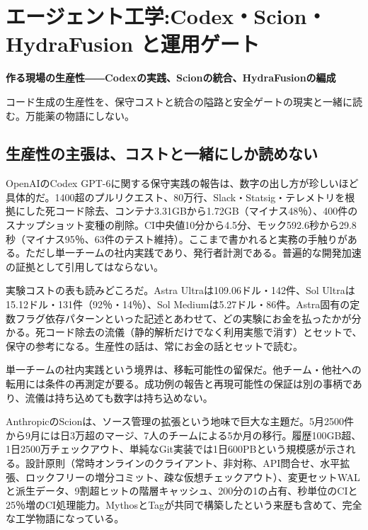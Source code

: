 \documentclass[lualatex,a4paper,10pt]{jlreq}
\begin{document}
\section{エージェント工学:Codex・Scion・HydraFusion と運用ゲート}
\label{sec:P4}

{\Large\bfseries 作る現場の生産性――Codexの実践、Scionの統合、HydraFusionの編成\par}
\smallskip
{\color{SurveyMuted}コード生成の生産性を、保守コストと統合の隘路と安全ゲートの現実と一緒に読む。万能薬の物語にしない。\par}
\bigskip

\subsection*{生産性の主張は、コストと一緒にしか読めない}

OpenAIのCodex GPT-6に関する保守実践の報告は、数字の出し方が珍しいほど具体的だ。1400超のプルリクエスト、80万行、Slack・Statsig・テレメトリを根拠にした死コード除去、コンテナ3.31GBから1.72GB（マイナス48％）、400件のスナップショット変種の削除。CI中央値10分から4.5分、モック592.6秒から29.8秒（マイナス95％、63件のテスト維持）。ここまで書かれると実務の手触りがある。ただし単一チームの社内実践であり、発行者計測である。普遍的な開発加速の証拠として引用してはならない。
\cite{B31}


実験コストの表も読みどころだ。Astra Ultraは109.06ドル・142件、Sol Ultraは15.12ドル・131件（92％・14％）、Sol Mediumは5.27ドル・86件。Astra固有の定数フラグ依存パターンといった記述とあわせて、どの実験にお金を払ったかが分かる。死コード除去の流儀（静的解析だけでなく利用実態で消す）とセットで、保守の参考になる。生産性の話は、常にお金の話とセットで読む。
\cite{B31}


単一チームの社内実践という境界は、移転可能性の留保だ。他チーム・他社への転用には条件の再測定が要る。成功例の報告と再現可能性の保証は別の事柄であり、流儀は持ち込めても数字は持ち込めない。
\cite{B31}


AnthropicのScionは、ソース管理の拡張という地味で巨大な主題だ。5月2500件から9月には日3万超のマージ、7人のチームによる5か月の移行。履歴100GB超、1日2500万チェックアウト、単純なGit実装では1日600PBという規模感が示される。設計原則（常時オンラインのクライアント、非対称、API問合せ、水平拡張、ロックフリーの増分コミット、疎な仮想チェックアウト）、変更セットWALと派生データ、9割超ヒットの階層キャッシュ、200分の1の占有、秒単位のCIと25％増のCI処理能力。MythosとTagが共同で構築したという来歴も含めて、完全な工学物語になっている。
\cite{B32}
\end{document}
